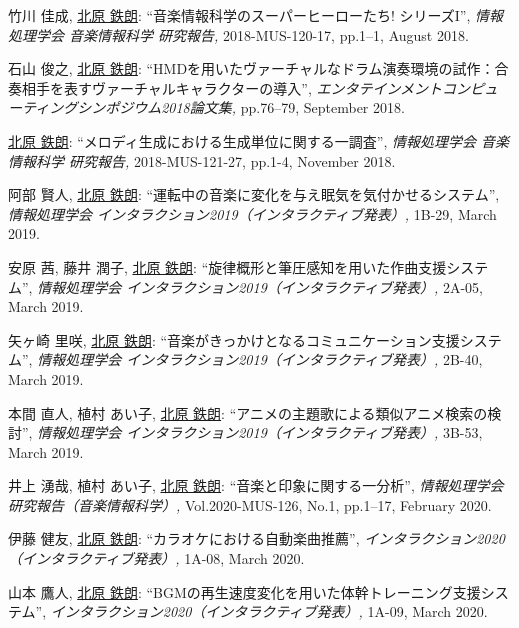 \begin{Enumerate}
\item 
竹川 佳成, 
\underline{北原 鉄朗}: 
    ``音楽情報科学のスーパーヒーローたち! シリーズI'', 
    {\it  情報処理学会 音楽情報科学 研究報告,
    } 2018-MUS-120-17, pp.1--1, August 2018. 

\item 
石山 俊之, 
\underline{北原 鉄朗}: 
    ``HMDを用いたヴァーチャルなドラム演奏環境の試作：合奏相手を表すヴァーチャルキャラクターの導入'', 
    {\it エンタテインメントコンピューティングシンポジウム2018論文集,
    } pp.76--79, September 2018. 

\item 
\underline{北原 鉄朗}: 
    ``メロディ生成における生成単位に関する一調査'', 
    {\it 情報処理学会 音楽情報科学 研究報告,
    } 2018-MUS-121-27, pp.1-4, November 2018. 

\item 
阿部 賢人, 
\underline{北原 鉄朗}: 
    ``運転中の音楽に変化を与え眠気を気付かせるシステム'', 
    {\it 情報処理学会 インタラクション2019（インタラクティブ発表）,
    } 1B-29, March 2019. 

\item 
安原 茜, 
藤井 潤子, 
\underline{北原 鉄朗}: 
    ``旋律概形と筆圧感知を用いた作曲支援システム'', 
    {\it 情報処理学会 インタラクション2019（インタラクティブ発表）,
    } 2A-05, March 2019. 

\item 
矢ヶ崎 里咲, 
\underline{北原 鉄朗}: 
    ``音楽がきっかけとなるコミュニケーション支援システム'', 
    {\it 情報処理学会 インタラクション2019（インタラクティブ発表）,
    } 2B-40, March 2019. 

\item 
本間 直人, 
植村 あい子, 
\underline{北原 鉄朗}: 
    ``アニメの主題歌による類似アニメ検索の検討'', 
    {\it 情報処理学会 インタラクション2019（インタラクティブ発表）,
    } 3B-53, March 2019. 

\item 
井上 湧哉, 
植村 あい子, 
\underline{北原 鉄朗}: 
    ``音楽と印象に関する一分析'', 
    {\it 情報処理学会研究報告（音楽情報科学）,
    } Vol.2020-MUS-126, No.1, pp.1--17, February 2020. 

\item 
伊藤 健友, 
\underline{北原 鉄朗}: 
    ``カラオケにおける自動楽曲推薦'', 
    {\it インタラクション2020（インタラクティブ発表）,
    } 1A-08, March 2020. 

\item 
山本 鷹人, 
\underline{北原 鉄朗}: 
    ``BGMの再生速度変化を用いた体幹トレーニング支援システム'', 
    {\it インタラクション2020（インタラクティブ発表）,
    } 1A-09, March 2020. 


\end{Enumerate}
